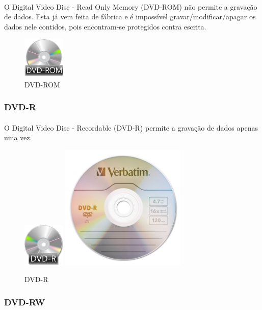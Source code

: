 \documentclass[a4paper]{report}
\begin{document}
\paragraph*{}O Digital Video Disc - Read Only Memory (DVD-ROM) não permite a gravação de dados. Esta já vem feita de fábrica e é impossível gravar/modificar/apagar os dados nele contidos, pois encontram-se protegidos contra escrita.

\begin{figure}[H]
\center
\includegraphics[width=2cm]{Imagens/dvd-rom.png}
\caption{DVD-ROM}
\end{figure}

\subsubsection{DVD-R} 
\paragraph*{}O Digital Video Disc - Recordable (DVD-R) permite a gravação de dados apenas uma vez.

\begin{figure}[H]
\center
\includegraphics[width=2cm]{Imagens/dvd-r.jpg}
\includegraphics[width=6cm]{Imagens/dvd-r-ex.jpeg}
\caption{DVD-R}
\end{figure}

\newpage

\subsubsection{DVD-RW} 
\end{document}
